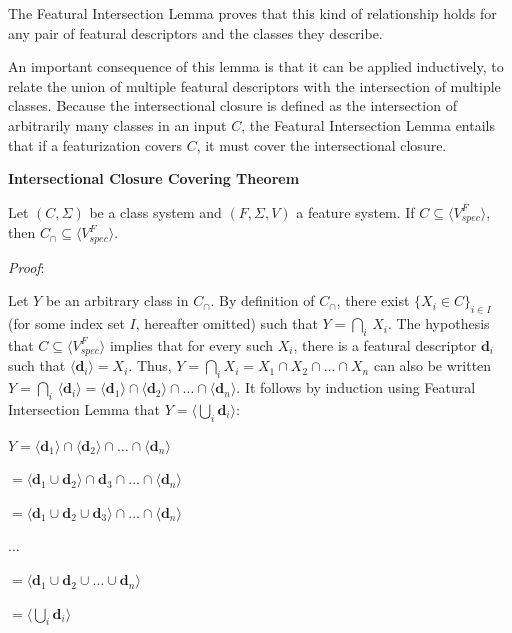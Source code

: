 \documentclass[12pt, oneside]{article}   	%
\newenvironment{clump}
{
	\edef\myindent{\the\parindent}
	\noindent\begin{minipage}{\textwidth}
	\setlength\parindent{\myindent}\fussy
}
{
	\end{minipage}
}
\begin{document}
\noindent The Featural Intersection Lemma proves that this kind of relationship holds for any pair of featural descriptors and the classes they describe.

An important consequence of this lemma is that it can be applied inductively, to relate the union of multiple featural descriptors with the intersection of multiple classes. Because the intersectional closure is defined as the intersection of arbitrarily many classes in an input $C$, the Featural Intersection Lemma entails that if a featurization covers $C$, it must cover the intersectional closure.

\begin{clump}
\vspace{\baselineskip} \noindent \textbf{Intersectional Closure Covering Theorem}

\noindent Let $(C, \Sigma)$ be a class system and $(F, \Sigma, V)$ a feature system. If $C \subseteq \langle V_{spec}^F \rangle$, then $C_\cap \subseteq \langle V_{spec}^F \rangle $.
\end{clump}
\noindent \textit{Proof}:

Let $Y$ be an arbitrary class in $C_\cap$. By definition of $C_\cap$, there exist $\{X_i \in C\}_{i \in I}$ (for some index set $I$, hereafter omitted) such that $Y = \bigcap_i \, X_i$. The hypothesis that $C \subseteq \langle V_{spec}^F \rangle $ implies that for every such $X_i$, there is a featural descriptor $\mathbf{d}_i$ such that $\langle \mathbf{d}_i \rangle = X_i$. Thus, $Y = \bigcap_i X_i = X_1 \cap X_2 \cap \ldots \cap X_n$ can also be written $Y = \bigcap_i \, \langle \mathbf{d}_i \rangle = \langle \mathbf{d}_1 \rangle \cap \langle \mathbf{d}_2 \rangle \cap \ldots \cap \langle \mathbf{d}_n \rangle$. It follows by induction using Featural Intersection Lemma that $Y = \langle \bigcup_i \mathbf{d}_i \rangle$:

$Y = \langle \mathbf{d}_1 \rangle \cap  \langle \mathbf{d}_2 \rangle \cap \ldots \cap  \langle \mathbf{d}_n \rangle$

\quad $ = \langle \mathbf{d}_1 \cup \mathbf{d}_2 \rangle \cap \mathbf{d}_3 \cap \ldots \cap \langle \mathbf{d}_n \rangle$

\quad $ = \langle \mathbf{d}_1 \cup \mathbf{d}_2 \cup \mathbf{d}_3 \rangle \cap \ldots \cap \langle \mathbf{d}_n \rangle$

\quad $\ldots$

\quad $= \langle \mathbf{d}_1 \cup \mathbf{d}_2 \cup \ldots \cup \mathbf{d}_n \rangle$

\quad $= \langle \bigcup_i  \mathbf{d}_i \rangle$
\end{document}
